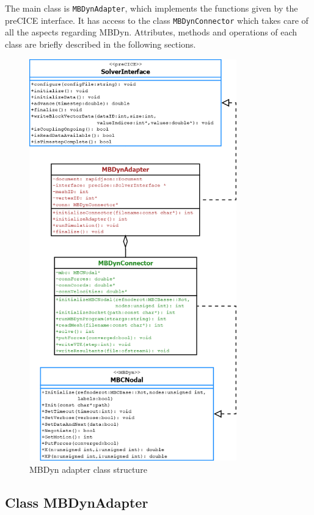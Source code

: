 The main class is \texttt{MBDynAdapter}, which implements the functions given by the preCICE interface. It has access to the class \texttt{MBDynConnector} which takes care of all the aspects regarding MBDyn. Attributes, methods and operations of each class are briefly described in the following sections.

\begin{figure}[htbp!]
	\centering
	\includegraphics[width=0.8\textwidth]{images/classdiag2}
	\caption{MBDyn adapter class structure}
	\label{fig:adapter-classdiag}
\end{figure}


\subsection{Class MBDynAdapter}
\label{sec:mbdyn-adapter.h}

